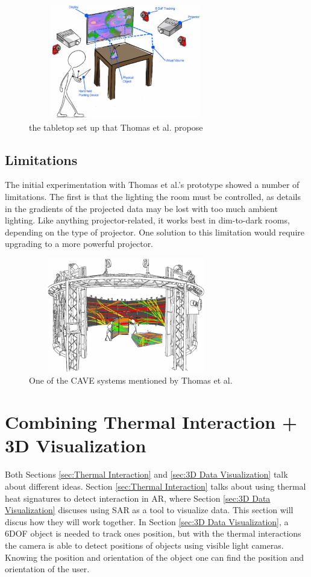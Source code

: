\documentclass{sig-alternate}
\begin{document}
\begin{figure}
	\includegraphics[width=8.5cm, height=5cm]{Tabletop}
	\caption{the tabletop set up that Thomas et al. propose \cite{3D}}
	\label{fig:Tabletop}
\end{figure}

\subsection{Limitations}
\label{sec:Limitations}
The initial experimentation with Thomas et al.'s \cite{3D} prototype showed a number of limitations. The first is that the lighting the room must be controlled, as details in the gradients of the projected data may be lost with too much ambient lighting. Like anything projector-related, it works best in dim-to-dark rooms, depending on the type of projector. One solution to this limitation would require upgrading to a more powerful projector.

\begin{figure}
	\includegraphics[width=8.5cm, height=5cm]{Cave}
	\caption{One of the CAVE systems mentioned by Thomas et al. \cite{3D}}
	\label{fig:Cave}
\end{figure}  

\section{Combining Thermal Interaction + 3D Visualization}
\label{sec:Joining Together}
Both Sections \ref{sec:Thermal Interaction} and \ref{sec:3D Data Visualization} talk about different ideas. Section \ref{sec:Thermal Interaction} talks about using thermal heat signatures to detect interaction in AR, where Section \ref{sec:3D Data Visualization} discuses using SAR as a tool to visualize data. This section will discus how they will work together. In Section \ref{sec:3D Data Visualization}, a 6DOF object is needed to track ones position, but with the thermal interactions the camera is able to detect positions of objects using visible light cameras. Knowing the position and orientation of the object one can find the position and orientation of the user.   
\end{document}
